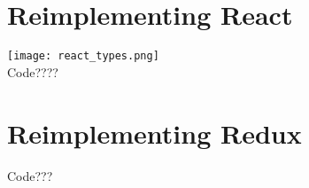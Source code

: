 \section{Reimplementing React}
\texttt{[image: react\_types.png]}\\
Code????
\vspace{0.5cm}
\section{Reimplementing Redux}
\vspace{0.5cm}
Code???
\vspace{0.5cm}

